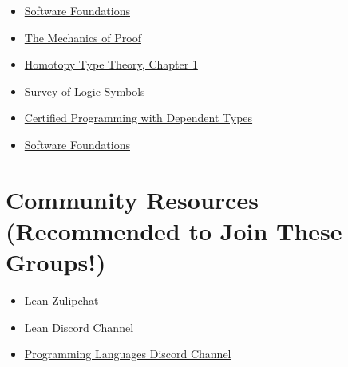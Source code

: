 \documentclass{book}
\providecommand{\tightlist}{%
  \setlength{\itemsep}{0pt}\setlength{\parskip}{0pt}}
\begin{document}
\begin{itemize}
\tightlist
\item
  \href{https://softwarefoundations.cis.upenn.edu/}{Software Foundations}
\item
  \href{https://hrmacbeth.github.io/math2001/}{The Mechanics of Proof}
\item
  \href{https://hott.github.io/book/hott-online-15-ge428abf.pdf}{Homotopy Type Theory, Chapter 1}
\item
  \href{https://mathvault.ca/hub/higher-math/math-symbols/logic-symbols/}{Survey of Logic Symbols}
\item
  \href{http://adam.chlipala.net/cpdt/}{Certified Programming with Dependent Types}
\item
  \href{https://softwarefoundations.cis.upenn.edu/}{Software Foundations}
\end{itemize}

\hypertarget{pandoc.profile.debug__pandoc__debug__src__resources.md__community-resources-recommended-to-join-these-groups}{%
\section*{Community Resources (Recommended to Join These Groups!)}\label{pandoc.profile.debug__pandoc__debug__src__resources.md__community-resources-recommended-to-join-these-groups}}

\begin{itemize}
\tightlist
\item
  \href{https://leanprover.zulipchat.com/}{Lean Zulipchat}
\item
  \href{https://discord.gg/WZ9bs9UCvx}{Lean Discord Channel}
\item
  \href{https://discord.gg/Up7KFNnF}{Programming Languages Discord Channel}
\end{itemize}
\end{document}

